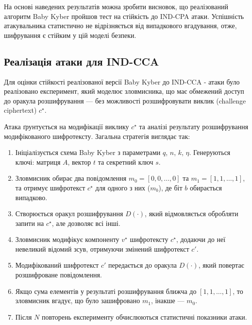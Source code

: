 На основі наведених результатів можна зробити висновок, що реалізований алгоритм Baby Kyber пройшов тест на стійкість до IND-CPA атаки. Успішність атакувальника статистично не відрізняється від випадкового вгадування, отже, шифрування є стійким у цій моделі безпеки.

\subsection*{Реалізація атаки для IND-CCA}

Для оцінки стійкості реалізованої версії Baby Kyber до IND-CCA - атаки було реалізовано експеримент, який моделює зловмисника, що має обмежений доступ до оракула розшифрування — без можливості розшифровувати виклик (challenge ciphertext) $c^\star$.

Атака ґрунтується на модифікації виклику $c^\star$ та аналізі результату розшифрування модифікованого шифротексту. Загальна стратегія виглядає так:

\begin{enumerate}
    \item Ініціалізується схема Baby Kyber з параметрами $q$, $n$, $k$, $\eta$. Генеруються ключі: матриця $A$, вектор $t$ та секретний ключ $s$.

    \item Зловмисник обирає два повідомлення $m_0 = [0, 0, \dots, 0]$ та $m_1 = [1, 1, \dots, 1]$, та отримує шифротекст $c^\star$ для одного з них ($m_b$), де біт $b$ обирається випадково.

    \item Створюється оракул розшифрування $D(\cdot)$, який відмовляється обробляти запити на $c^\star$, але дозволяє всі інші.

    \item Зловмисник модифікує компоненту $v^\star$ шифротексту $c^\star$, додаючи до неї невеликий відомий зсув, отримуючи змінений шифротекст $c'$.

    \item Модифікований шифротекст $c'$ передається до оракула $D(\cdot)$, який повертає розшифроване повідомлення.

    \item Якщо сума елементів у результаті розшифрування ближча до $[1, 1, \dots, 1]$, то зловмисник вгадує, що було зашифровано $m_1$, інакше — $m_0$.

    \item Після $N$ повторень експерименту обчислюються статистичні показники атаки.
\end{enumerate}

